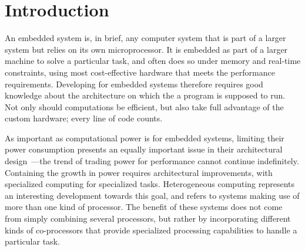 \documentclass[../paper.tex]{subfiles}
\begin{document}
\chapter{Introduction}
\label{intro}

An embedded system is, in brief, any computer system that is part of a larger system but relies on its own microprocessor. It is embedded as part of a larger machine to solve a particular task, and often does so under memory and real-time constraints, using most cost-effective hardware that meets the performance requirements. Developing for embedded systems therefore requires good knowledge about the architecture on which the a program is supposed to run. Not only should computations be efficient, but also take full advantage of the custom hardware; every line of code counts.




As important as computational power is for embedded systems, limiting their power consumption presents an equally important issue in their architectural design~\cite{mudge2001}---the trend of trading power for performance cannot continue indefinitely. Containing the growth in power requires architectural improvements, with specialized computing for specialized tasks. Heterogeneous computing represents an interesting development towards this goal, and refers to systems making use of more than one kind of processor. The benefit of these systems does not come from simply combining several processors, but rather by incorporating different kinds of co-processors that provide specialized processing capabilities to handle a particular task.
\end{document}
